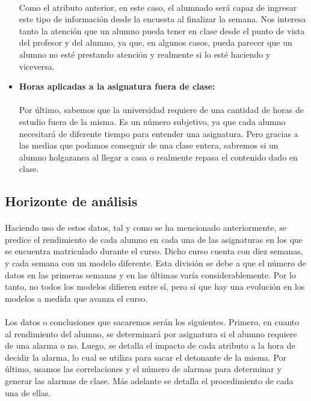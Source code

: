 \begin{itemize}
\paragraph{}
Como el atributo anterior, en este caso, el alumnado será capaz de
ingresar este tipo de información desde la encuesta al finalizar la
semana.  Nos interesa tanto la atención que un alumno pueda tener en
clase desde el punto de vista del profesor y del alumno, ya que, en
algunos casos, pueda parecer que un alumno no esté prestando atención
y realmente si lo esté haciendo y viceversa.
\item \textbf{Horas aplicadas a la asignatura fuera de clase:}
\paragraph{}
Por último, sabemos que la universidad requiere de una cantidad de
horas de estudio fuera de la misma. Es un número subjetivo, ya que
cada alumno necesitará de diferente tiempo para entender una
asignatura. Pero gracias a las medias que podamos conseguir de una
clase entera, sabremos si un alumno holgazanea al llegar a casa o
realmente repasa el contenido dado en clase.
\end{itemize}

\subsection{Horizonte de análisis}
\paragraph{}
Haciendo uso de estos datos, tal y como se ha mencionado
anteriormente, se predice el rendimiento de cada alumno en cada una de
las asignaturas en los que se encuentra matriculado durante el
curso. Dicho curso cuenta con diez semanas, y cada semana con un
modelo diferente. Esta división se debe a que el número de datos en
las primeras semanas y en las últimas varía considerablemente. Por lo
tanto, no todos los modelos difieren entre sí, pero sí que hay una
evolución en los modelos a medida que avanza el curso.
\paragraph{}
Los datos o conclusiones que sacaremos serán los siguientes. Primero,
en cuanto al rendimiento del alumno, se determinará por asignatura si
el alumno requiere de una alarma o no. Luego, se detalla el impacto de
cada atributo a la hora de decidir la alarma, lo cual se utiliza para
sacar el detonante de la misma. Por último, usamos las correlaciones y
el número de alarmas para determinar y generar las alarmas de
clase. Más adelante se detalla el procedimiento de cada una de ellas.


